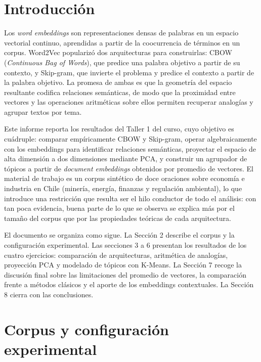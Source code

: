 \documentclass[12pt, a4paper]{article}
\begin{document}
\section{Introducción}

Los \textit{word embeddings} son representaciones densas de palabras en un espacio vectorial
continuo, aprendidas a partir de la coocurrencia de términos en un corpus. Word2Vec
\citep{mikolov2013efficient, mikolov2013distributed} popularizó dos arquitecturas para construirlas:
CBOW (\textit{Continuous Bag of Words}), que predice una palabra objetivo a partir de su contexto, y
Skip-gram, que invierte el problema y predice el contexto a partir de la palabra objetivo. La
promesa de ambas es que la geometría del espacio resultante codifica relaciones semánticas, de modo
que la proximidad entre vectores y las operaciones aritméticas sobre ellos permiten recuperar
analogías y agrupar textos por tema.

Este informe reporta los resultados del Taller 1 del curso, cuyo objetivo es cuádruple: comparar
empíricamente CBOW y Skip-gram, operar algebraicamente con los embeddings para identificar
relaciones semánticas, proyectar el espacio de alta dimensión a dos dimensiones mediante PCA, y
construir un agrupador de tópicos a partir de \textit{document embeddings} obtenidos por promedio de
vectores. El material de trabajo es un corpus sintético de doce oraciones sobre economía e industria
en Chile (minería, energía, finanzas y regulación ambiental), lo que introduce una restricción que
resulta ser el hilo conductor de todo el análisis: con tan poca evidencia, buena parte de lo que se
observa se explica más por el tamaño del corpus que por las propiedades teóricas de cada
arquitectura.

El documento se organiza como sigue. La Sección 2 describe el corpus y la configuración
experimental. Las secciones 3 a 6 presentan los resultados de los cuatro ejercicios: comparación de
arquitecturas, aritmética de analogías, proyección PCA y modelado de tópicos con K-Means. La
Sección 7 recoge la discusión final sobre las limitaciones del promedio de vectores, la comparación
frente a métodos clásicos y el aporte de los embeddings contextuales. La Sección 8 cierra con las
conclusiones.

\section{Corpus y configuración experimental}
\end{document}
